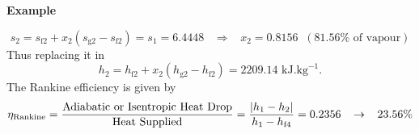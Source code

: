 \begin{MyExample}{\begin{center}{\bf Example}\end{center}}
      \begin{displaymath}
         s_{2} = s_{\text{f}2} + x_{2}\left(s_{\text{g}2} - s_{\text{f}2}\right) = s_{1} = 6.4448 \;\;\;\Rightarrow \;\;\; x_{2} = 0.8156 \;\;(81.56\% \text{ of vapour})
      \end{displaymath}
Thus replacing it in 
      \begin{displaymath}
          h_{2} = h_{\text{f}2} + x_{2}\left(h_{\text{g}2} - h_{\text{f}2}\right) = 2209.14\text{ kJ.kg}^{-1}.
      \end{displaymath}
The Rankine efficiency is given by
      \begin{displaymath}
           \eta_{\text{Rankine}} = \displaystyle\frac{\text{Adiabatic or Isentropic Heat Drop}}{\text{Heat Supplied}} = \displaystyle\frac{\left|h_{1}-h_{2}\right|}{h_{1}-h_{\text{f}4}} = 0.2356\;\;\;\rightarrow \;\;\; 23.56\%
      \end{displaymath}
    
   \end{MyExample}


